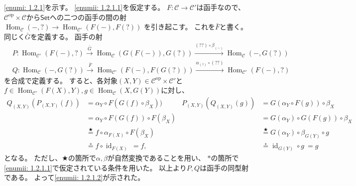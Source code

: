 \documentclass[uplatex,dvipdfmx]{jsarticle}
\makeatletter
\theoremstyle{definition}
\renewenvironment{proof}[1][\proofname]{
  \pushQED{\qed}%
  \normalfont \topsep6\p@\@plus6\p@\relax
  \trivlist
  \item[\hskip\labelsep
    #1\@addpunct{\textbf{.}}]\ignorespaces
}{%
  \popQED\endtrivlist\@endpefalse
}
\providecommand{\proofname}{証明}
\DeclareMathOperator{\Hom}{\mathrm{Hom}}
\DeclareMathOperator{\id}{\mathrm{id}}
\newcommand{\op}{\mathrm{op}}
\newcommand\sfSet{\mathsf{Set}}
\newcommand\mcC{\mathcal{C}}
\makeatother
\begin{document}
\begin{proof}
  \ref{enumi: 1.2.1}を示す。
  \ref{enumii: 1.2.1.1}を仮定する。
  \(F:\mcC\to \mcC'\)は函手なので、
  \(\mcC^{\op}\times\mcC\)から\(\sfSet\)への二つの函手の間の射
  \(\Hom_{\mcC}(-,?) \to \Hom_{\mcC'}(F(-),F(?))\)
  を引き起こす。
  これを\(\bar{F}\)と書く。
  同じく\(\bar{G}\)を定義する。
  函手の射
  \begin{align*}
    &P: \Hom_{\mcC'}(F(-),?) \xrightarrow{\bar{G}} \Hom_{\mcC}(G(F(-)),G(?))
    \xrightarrow{(??)\circ \beta_{(-)}} \Hom_{\mcC}(-,G(?)) \\
    &Q: \Hom_{\mcC}(-,G(?)) \xrightarrow{\bar{F}} \Hom_{\mcC'}(F(-),F(G(?)))
    \xrightarrow{\alpha_{(?)} \circ (??)} \Hom_{\mcC'}(F(-),?)
  \end{align*}
  を合成で定義する。
  すると、各対象\((X,Y)\in \mcC^{\op}\times \mcC'\)と
  \(f\in \Hom_{\mcC'}(F(X),Y), g\in \Hom_{\mcC}(X,G(Y))\)に対し、
  \begin{align*}
    Q_{(X,Y)}(P_{(X,Y)}(f))
    &= \alpha_Y \circ F(G(f)\circ \beta_X))
    & P_{(X,Y)}(Q_{(X,Y)}(g))
    &= G(\alpha_Y \circ F(g)) \circ \beta_X \\
    &= \alpha_Y \circ F(G(f)) \circ F(\beta_X)
    &&= G(\alpha_Y) \circ G(F(g)) \circ \beta_X \\
    &\overset{\bigstar}{=} f \circ \alpha_{F(X)} \circ F(\beta_X)
    &&\overset{\bigstar}{=} G(\alpha_Y) \circ \beta_{G(Y)} \circ g \\
    &\overset{*}{=} f \circ \id_{F(X)} \ = f,
    &&\overset{*}{=} \id_{G(Y)} \circ g \ = g
  \end{align*}
  となる。
  ただし、\(\bigstar\)の箇所で\(\alpha,\beta\)が自然変換であることを用い、
  \(*\)の箇所で\ref{enumii: 1.2.1.1}で仮定されている条件を用いた。
  以上より\(P,Q\)は函手の同型射である。
  よって\ref{enumii: 1.2.1.2}が示された。


\end{proof}
\end{document}
